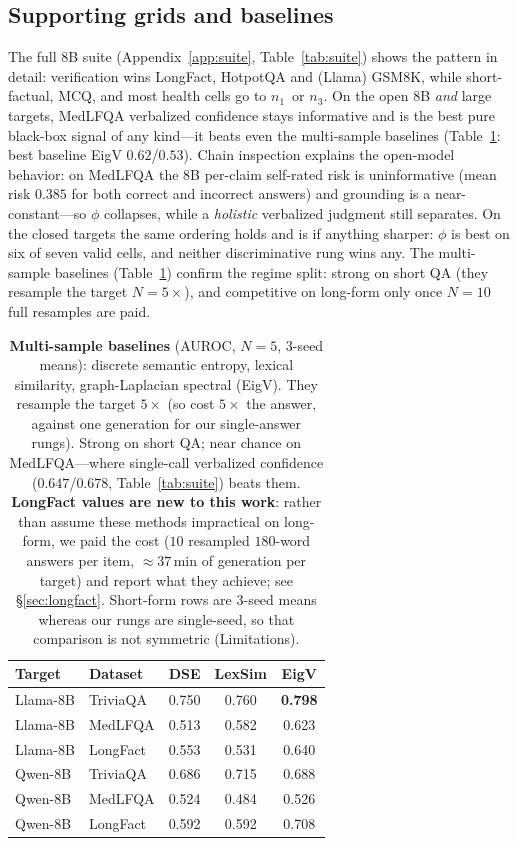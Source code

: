 \documentclass[11pt]{article}
\newcommand{\nverb}{$n_1$}     %
\newcommand{\nphi}{$n_3$}      %
\begin{document}
\subsection{Supporting grids and baselines}
The full 8B suite (Appendix~\ref{app:suite}, Table~\ref{tab:suite}) shows the pattern in
detail: verification wins LongFact, HotpotQA and (Llama) GSM8K, while short-factual, MCQ,
and most health cells go to \nverb\ or \nphi. On the open 8B \emph{and} large targets, MedLFQA
verbalized confidence stays informative and is the best pure black-box signal of any kind---it
beats even the multi-sample baselines (Table~\ref{tab:baselines}: best baseline EigV
$0.62$/$0.53$). Chain inspection explains the open-model behavior: on MedLFQA the 8B per-claim
self-rated risk is uninformative (mean risk $0.385$ for both correct and incorrect answers) and
grounding is a near-constant---so $\phi$ collapses, while a \emph{holistic} verbalized judgment
still separates. On the closed targets the same ordering holds and is if anything sharper: $\phi$ is best on six
of seven valid cells, and neither discriminative rung wins any. The multi-sample baselines (Table~\ref{tab:baselines}) confirm the regime split:
strong on short QA (they resample the target $N{=}5\times$), and competitive on long-form
only once $N{=}10$ full resamples are paid.

\begin{table}[t]
\centering\small
\begin{tabular}{llccc}
\toprule
Target & Dataset & DSE & LexSim & EigV \\
\midrule
Llama-8B & TriviaQA & 0.750 & 0.760 & \textbf{0.798} \\
Llama-8B & MedLFQA  & 0.513 & 0.582 & 0.623 \\
Llama-8B & LongFact & 0.553 & 0.531 & 0.640 \\
Qwen-8B  & TriviaQA & 0.686 & 0.715 & 0.688 \\
Qwen-8B  & MedLFQA  & 0.524 & 0.484 & 0.526 \\
Qwen-8B  & LongFact & 0.592 & 0.592 & 0.708 \\
\bottomrule
\end{tabular}
\caption{\textbf{Multi-sample baselines} (AUROC, $N{=}5$, 3-seed means): discrete semantic
entropy, lexical similarity, graph-Laplacian spectral (EigV). They resample the target
$5\times$ (so cost $5\times$ the answer, against one generation for our single-answer rungs). Strong on short QA; near chance on MedLFQA---where single-call verbalized confidence
($0.647$/$0.678$, Table~\ref{tab:suite}) beats them. \textbf{LongFact values are new to this
work}: rather than assume these methods impractical on long-form, we paid the cost
($10$ resampled $180$-word answers per item, ${\approx}37$\,min of generation per target) and
report what they achieve; see \S\ref{sec:longfact}. Short-form rows are 3-seed means whereas our
rungs are single-seed, so that comparison is not symmetric (Limitations).}
\label{tab:baselines}
\end{table}
\end{document}
